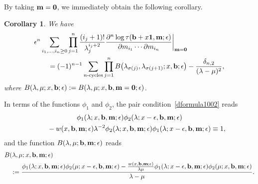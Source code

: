 \documentclass[pdftex]{sigma}
\newcommand{\e}{\epsilon}
\newcommand{\p}{\partial}
\newcommand{\nn}{\nonumber}
\numberwithin{equation}{section}
\newtheorem{Corollary}[Theorem]{Corollary}
\begin{document}
By taking ${\bf m}={\bf 0}$, we immediately obtain the following corollary.
\begin{Corollary} We have
\begin{align}
& \e^n\sum_{i_1,\dots,i_n\ge0}
\prod_{j=1}^n \frac{(i_j+1)!}{\lambda_j^{i_j+2}} \frac{\p^n \log \tau({\bf b}+x{\bf 1},{\bf m};\e)}{\p m_{i_1} \cdots \p m_{i_n}}\bigg|_{{\bf m}={\bf 0}}
\nn\\
& \qquad{} = (-1)^{n-1}
\sum_{\text{$n$-cycles}}
\prod_{j=1}^n B\bigl(\lambda_{\sigma(j)},\lambda_{\sigma(j+1)}; x, {\bf b};\e\bigr) - \frac{\delta_{n,2}}{(\lambda-\mu)^2},\label{Y926-ext}
\end{align}
where $B(\lambda,\mu; x, {\bf b};\e):=B(\lambda,\mu; x, {\bf b},{\bf m}={\bf 0};\e)$.
\end{Corollary}

In terms of the functions $\phi_1$ and $\phi_2$, the pair condition~\eqref{dformula1002} reads
\begin{gather}
\phi_1(\lambda; x, {\bf b}, {\bf m};\e) \phi_2(\lambda; x-\e, {\bf b}, {\bf m};\e)\nn \\
\qquad{}- w(x, {\bf b}, {\bf m};\e)
\lambda^{-2} \phi_2(\lambda; x, {\bf b}, {\bf m};\e) \phi_1(\lambda; x-\e, {\bf b}, {\bf m};\e) \equiv 1,\label{pairconditionphi}
\end{gather}
and the function $B(\lambda,\mu;{\bf b},{\bf m};\e)$ reads
\begin{align}
&B(\lambda,\mu; x, {\bf b}, {\bf m};\e) \label{Bphiab} \\
&\quad{}:= \frac{\phi_1(\lambda; x, {\bf b}, {\bf m};\e) \phi_2(\mu; x-\e,{\bf b}, {\bf m};\e)
- \frac{w(x, {\bf b}, {\bf m};\e)}{\lambda\mu} \phi_1(\lambda; x-\e,{\bf b}, {\bf m};\e) \phi_2(\mu; x, {\bf b}, {\bf m};\e)}{\lambda-\mu}. \nn
\end{align}
\end{document}
